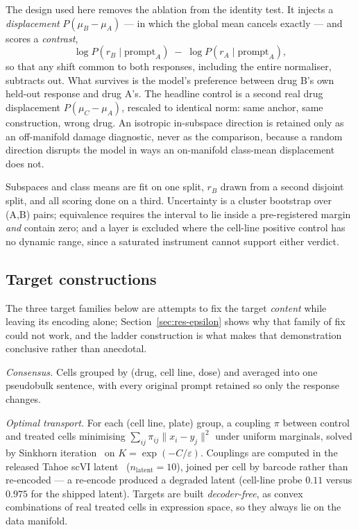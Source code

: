 The design used here removes the ablation from the identity test. It injects a \emph{displacement}
$P(\mu_B - \mu_A)$ --- in which the global mean cancels exactly --- and scores a \emph{contrast},
\begin{equation}
  \log P\!\left(r_B \mid \textrm{prompt}_A\right) \;-\; \log P\!\left(r_A \mid \textrm{prompt}_A\right),
\end{equation}
so that any shift common to both responses, including the entire normaliser, subtracts out. What
survives is the model's preference between drug B's own held-out response and drug A's. The headline
control is a second real drug displacement $P(\mu_C - \mu_A)$, rescaled to identical norm: same
anchor, same construction, wrong drug. An isotropic in-subspace direction is retained only as an
off-manifold damage diagnostic, never as the comparison, because a random direction disrupts the
model in ways an on-manifold class-mean displacement does not.

Subspaces and class means are fit on one split, $r_B$ drawn from a second disjoint split, and all
scoring done on a third. Uncertainty is a cluster bootstrap over (A,B) pairs; equivalence requires
the interval to lie inside a pre-registered margin \emph{and} contain zero; and a layer is excluded
where the cell-line positive control has no dynamic range, since a saturated instrument cannot
support either verdict.

\subsection{Target constructions}
\label{sec:methods-targets}

The three target families below are attempts to fix the target \emph{content} while leaving its
encoding alone; Section~\ref{sec:res-epsilon} shows why that family of fix could not work, and the
ladder construction is what makes that demonstration conclusive rather than anecdotal.

\emph{Consensus.} Cells grouped by (drug, cell line, dose) and averaged into one pseudobulk
sentence, with every original prompt retained so only the response changes.

\emph{Optimal transport.} For each (cell line, plate) group, a coupling $\pi$ between control
and treated cells minimising $\sum_{ij}\pi_{ij}\lVert x_i - y_j\rVert^2$ under uniform marginals,
solved by Sinkhorn iteration~\cite{cuturi} on $K = \exp(-C/\varepsilon)$. Couplings are computed in
the released Tahoe scVI latent~\cite{scvi} ($n_{\textrm{latent}} = 10$), joined per cell by barcode
rather than re-encoded --- a re-encode produced a degraded latent (cell-line probe $0.11$ versus
$0.975$ for the shipped latent). Targets are built \emph{decoder-free}, as convex combinations of
real treated cells in expression space, so they always lie on the data manifold.

